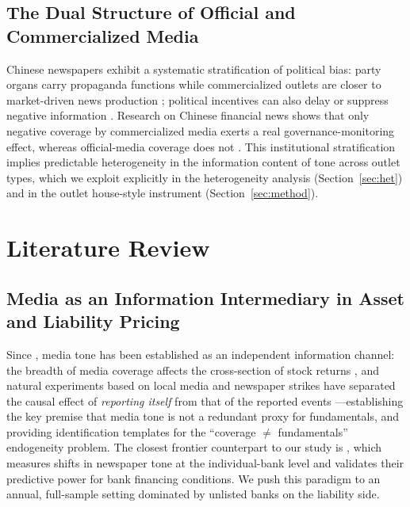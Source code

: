 \subsection{The Dual Structure of Official and Commercialized Media}
Chinese newspapers exhibit a systematic stratification of political
bias: party organs carry propaganda functions while commercialized
outlets are closer to market-driven news production
\parencite{qin2018mediabias}; political incentives can also delay or
suppress negative information \parencite{piotroski2015political}.
Research on Chinese financial news shows that only negative coverage by
commercialized media exerts a real governance-monitoring effect,
whereas official-media coverage does not \parencite{you2018pen}. This
institutional stratification implies predictable heterogeneity in the
information content of tone across outlet types, which we exploit
explicitly in the heterogeneity analysis (Section~\ref{sec:het}) and in
the outlet house-style instrument (Section~\ref{sec:method}).

\section{Literature Review}\label{sec:lit}

\subsection{Media as an Information Intermediary in Asset and
Liability Pricing}
Since \textcite{tetlock2007giving}, media tone has been established as
an independent information channel: the breadth of media coverage
affects the cross-section of stock returns
\parencite{fangperess2009media}, and natural experiments based on local
media and newspaper strikes have separated the causal effect of
\emph{reporting itself} from that of the reported events
\parencite{engelberg2011causal, peress2014media}---establishing the key
premise that media tone is not a redundant proxy for fundamentals, and
providing identification templates for the ``coverage $\ne$
fundamentals'' endogeneity problem. The closest frontier counterpart to
our study is \textcite{marchetti2025tone}, which measures shifts in
newspaper tone at the individual-bank level and validates their
predictive power for bank financing conditions. We push this paradigm
to an annual, full-sample setting dominated by unlisted banks on the
liability side.

